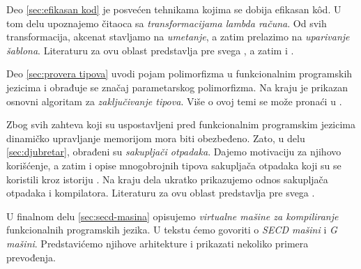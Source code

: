 Deo \ref{sec:efikasan kod} je posvećen tehnikama kojima se dobija efikasan k\^od. U tom delu upoznajemo čitaoca sa \textit{transformacijama lambda računa}. Od svih transformacija, akcenat stavljamo na \textit{umetanje}, a zatim prelazimo na \textit{uparivanje šablona}. Literaturu za ovu oblast predstavlja pre svega \cite{the-implementation-of-functional-programming-languages}, a zatim i \cite{compilation-by-program-transformation, haskell-by-program-transformation, secrets-haskell-compiler-inliner, compiler-design, compiling-fl}.

Deo \ref{sec:provera tipova} uvodi pojam polimorfizma u funkcionalnim programskih jezicima i obrađuje se značaj parametarskog polimorfizma. Na kraju je prikazan osnovni algoritam za \textit{zaključivanje tipova}. Više o ovoj temi se može pronaći u \cite{the-implementation-of-functional-programming-languages, basic-typechecking}.

Zbog svih zahteva koji su uspostavljeni pred funkcionalnim programskim jezicima dinamičko upravljanje memorijom mora biti obezbeđeno. Zato, u delu \ref{sec:djubretar}, obrađeni su \textit{sakupljači otpadaka}. Dajemo motivaciju za njihovo korišćenje, a zatim i opise mnogobrojnih tipova sakupljača otpadaka koji su se koristili kroz istoriju \cite{appel, mcca60, col60, feni69, app87}. Na kraju dela ukratko prikazujemo odnos sakupljača otpadaka i kompilatora. Literaturu za ovu oblast predstavlja pre svega \cite{the-implementation-of-functional-programming-languages}.

U finalnom delu \ref{sec:secd-masina} opisujemo \textit{virtualne mašine za kompiliranje} funkcionalnih programskih jezika. U tekstu ćemo govoriti o \textit{SECD mašini} i \textit{G mašini}. Predstavićemo njihove arhitekture i prikazati nekoliko primera prevođenja.
